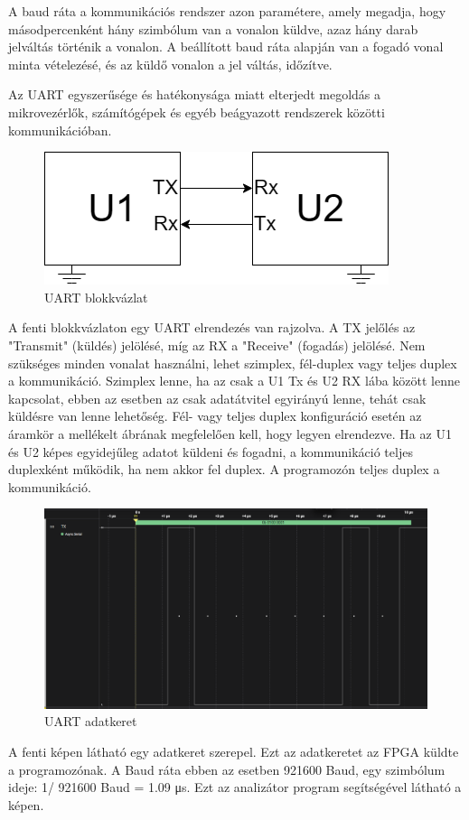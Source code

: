 \documentclass[a4paper,12pt,oneside]{book}
\begin{document}
A baud ráta a kommunikációs rendszer azon paramétere, amely megadja, hogy másodpercenként hány szimbólum van a vonalon küldve, azaz hány darab jelváltás történik a vonalon. A beállított baud ráta alapján van a fogadó vonal minta vételezésé, és az küldő vonalon a jel váltás, időzítve.

Az UART egyszerűsége és hatékonysága miatt elterjedt megoldás a mikrovezérlők, számítógépek és egyéb beágyazott rendszerek közötti kommunikációban.
\begin{figure}[H]
	\centering
	\includegraphics[trim=1mm 1mm 1mm 1mm,scale=0.8]{uartblock.png}
	\caption{UART blokkvázlat}
	\label{UARTblockk}
\end{figure}
A fenti blokkvázlaton egy UART elrendezés van rajzolva. A TX jelőlés az "Transmit" (küldés) jelölésé, míg az RX a "Receive" (fogadás) jelölésé. Nem szükséges minden vonalat használni, lehet szimplex, fél-duplex vagy teljes duplex a kommunikáció. Szimplex lenne, ha az csak a U1 Tx és U2 RX lába között lenne kapcsolat, ebben az esetben az csak adatátvitel egyirányú lenne, tehát csak küldésre van lenne lehetőség. Fél- vagy teljes duplex konfiguráció esetén az áramkör a mellékelt ábrának megfelelően kell, hogy legyen elrendezve. Ha az U1 és U2 képes egyidejűleg adatot küldeni és fogadni, a kommunikáció teljes duplexként működik, ha nem akkor fel duplex. A programozón teljes duplex a kommunikáció.%

\begin{figure}[H]
	\centering
	\includegraphics[trim=1mm 1mm 1mm 1mm,scale=0.35]{UARTfromAnalyzer.PNG}
	\caption{UART adatkeret}
	\label{UARTkep}
\end{figure}
A fenti képen látható egy adatkeret szerepel. Ezt az adatkeretet az FPGA küldte a programozónak. A Baud ráta ebben az esetben 921600 Baud, egy szimbólum ideje: 1/ 921600 Baud = 1.09 μs. Ezt az analizátor program segítségével látható a képen.
\end{document}
